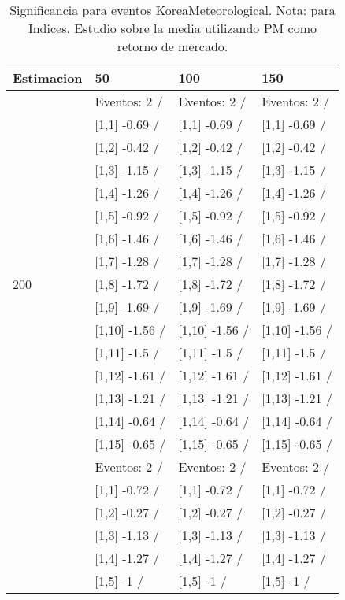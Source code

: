 \begin{table}

\caption{Significancia para eventos KoreaMeteorological. Nota: para Indices. Estudio sobre la media utilizando PM como retorno de mercado.}
\centering
\begin{tabular}[t]{llll}
\toprule
Estimacion & 50 & 100 & 150\\
\midrule
 & Eventos:  2 / & Eventos:  2 / & Eventos:  2 /\\
 & {}[1,1] -0.69  / & {}[1,1] -0.69  / & {}[1,1] -0.69  /\\
 & {}[1,2] -0.42  / & {}[1,2] -0.42  / & {}[1,2] -0.42  /\\
 & {}[1,3] -1.15  / & {}[1,3] -1.15  / & {}[1,3] -1.15  /\\
 & {}[1,4] -1.26  / & {}[1,4] -1.26  / & {}[1,4] -1.26  /\\
\addlinespace
 & {}[1,5] -0.92  / & {}[1,5] -0.92  / & {}[1,5] -0.92  /\\
 & {}[1,6] -1.46  / & {}[1,6] -1.46  / & {}[1,6] -1.46  /\\
 & {}[1,7] -1.28  / & {}[1,7] -1.28  / & {}[1,7] -1.28  /\\
200 & {}[1,8] -1.72  / & {}[1,8] -1.72  / & {}[1,8] -1.72  /\\
 & {}[1,9] -1.69  / & {}[1,9] -1.69  / & {}[1,9] -1.69  /\\
\addlinespace
 & {}[1,10] -1.56  / & {}[1,10] -1.56  / & {}[1,10] -1.56  /\\
 & {}[1,11] -1.5  / & {}[1,11] -1.5  / & {}[1,11] -1.5  /\\
 & {}[1,12] -1.61  / & {}[1,12] -1.61  / & {}[1,12] -1.61  /\\
 & {}[1,13] -1.21  / & {}[1,13] -1.21  / & {}[1,13] -1.21  /\\
 & {}[1,14] -0.64  / & {}[1,14] -0.64  / & {}[1,14] -0.64  /\\
\addlinespace
 & {}[1,15] -0.65  / & {}[1,15] -0.65  / & {}[1,15] -0.65  /\\
 & Eventos:  2 / & Eventos:  2 / & Eventos:  2 /\\
 & {}[1,1] -0.72  / & {}[1,1] -0.72  / & {}[1,1] -0.72  /\\
 & {}[1,2] -0.27  / & {}[1,2] -0.27  / & {}[1,2] -0.27  /\\
 & {}[1,3] -1.13  / & {}[1,3] -1.13  / & {}[1,3] -1.13  /\\
\addlinespace
 & {}[1,4] -1.27  / & {}[1,4] -1.27  / & {}[1,4] -1.27  /\\
 & {}[1,5] -1  / & {}[1,5] -1  / & {}[1,5] -1  /\\

\end{tabular}
\end{table}
